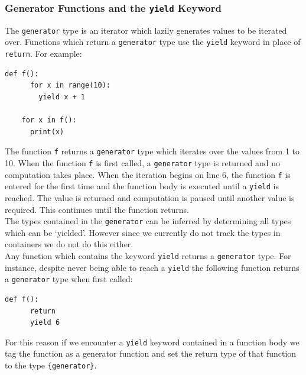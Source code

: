 \documentclass[12pt, titlepage]{article}
\begin{document}
\subsubsection{Generator Functions and the \texttt{yield} Keyword}
The \texttt{generator} type is an iterator which lazily generates values to be iterated over. Functions which return a \texttt{generator} type use the \texttt{yield} keyword in place of \texttt{return}. For example:
\begin{lstlisting}[mathescape]
    def f():
      for x in range(10):
        yield x + 1
    
    for x in f():
      print(x)
\end{lstlisting}
The function \texttt{f} returns a \texttt{generator} type which iterates over the values from 1 to 10. When the function \texttt{f} is first called, a \texttt{generator} type is returned and no computation takes place. When the iteration begins on line 6, the function \texttt{f} is entered for the first time and the function body is executed until a \texttt{yield} is reached. The value is returned and computation is paused until another value is required. This continues until the function returns. \\
\indent The types contained in the \texttt{generator} can be inferred by determining all types which can be `yielded'. However since we currently do not track the types in containers we do not do this either. \\
\indent Any function which contains the keyword \texttt{yield} returns a \texttt{generator} type. For instance, despite never being able to reach a \texttt{yield} the following function returns a \texttt{generator} type when first called:
\begin{lstlisting}[mathescape]
    def f():
      return
      yield 6
\end{lstlisting}
For this reason if we encounter a \texttt{yield} keyword contained in a function body we tag the function as a generator function and set the return type of that function to the type \texttt{\{generator\}}.
\end{document}
